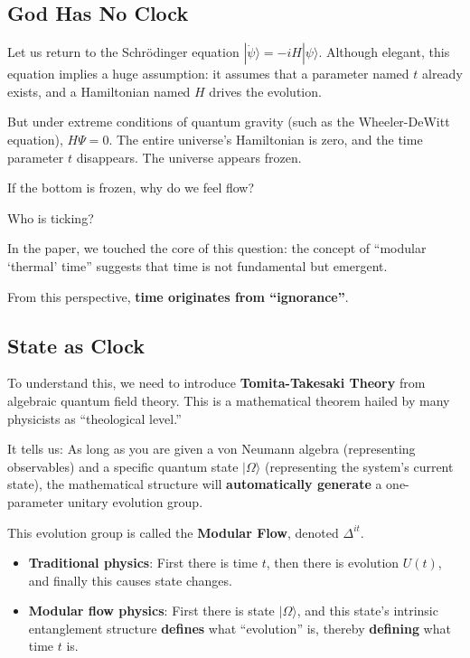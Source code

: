 \documentclass[11pt,a4paper,twoside]{book}
\begin{document}
\subsection{God Has No Clock}

Let us return to the Schrödinger equation $|\dot{\psi}\rangle = -iH|\psi\rangle$. Although elegant, this equation implies a huge assumption: it assumes that a parameter named \textbf{$t$} already exists, and a Hamiltonian named \textbf{$H$} drives the evolution.

But under extreme conditions of quantum gravity (such as the Wheeler-DeWitt equation), $H \Psi = 0$. The entire universe's Hamiltonian is zero, and the time parameter $t$ disappears. The universe appears frozen.

If the bottom is frozen, why do we feel flow?

Who is ticking?

In the paper, we touched the core of this question: the concept of ``modular `thermal' time'' suggests that time is not fundamental but emergent.

From this perspective, \textbf{time originates from ``ignorance''}.

\subsection{State as Clock}

To understand this, we need to introduce \textbf{Tomita-Takesaki Theory} from algebraic quantum field theory. This is a mathematical theorem hailed by many physicists as ``theological level.''

It tells us: As long as you are given a von Neumann algebra (representing observables) and a specific quantum state $|\Omega\rangle$ (representing the system's current state), the mathematical structure will \textbf{automatically generate} a one-parameter unitary evolution group.

This evolution group is called the \textbf{Modular Flow}, denoted $\Delta^{it}$.

\begin{itemize}
\item \textbf{Traditional physics}: First there is time $t$, then there is evolution $U(t)$, and finally this causes state changes.

\item \textbf{Modular flow physics}: First there is state $|\Omega\rangle$, and this state's intrinsic entanglement structure \textbf{defines} what ``evolution'' is, thereby \textbf{defining} what time $t$ is.
\end{itemize}
\end{document}
